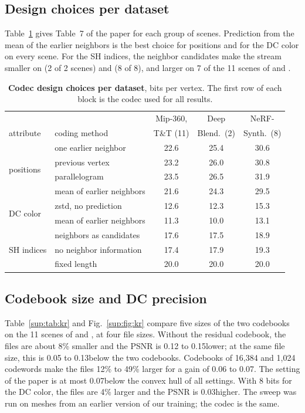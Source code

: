 \subsection{Design choices per dataset}
Table~\ref{sup:tab:choices} gives Table~7 of the paper for each group of scenes. Prediction from the mean of the earlier neighbors is the best choice for positions and for the DC color on every scene. For the SH indices, the neighbor candidates make the stream smaller on \DeepBlending (2 of 2 scenes) and \NeRFSyn (8 of 8), and larger on 7 of the 11 scenes of \MipNeRF and \TandT.

\begin{table}[h]\centering\footnotesize
\caption{\textbf{Codec design choices per dataset}, bits per vertex. The first row of each block is the codec used for all results.}
\label{sup:tab:choices}
\setlength{\tabcolsep}{3pt}
\begin{tabular}{@{}llccc@{}}
\toprule
 & & Mip-360, & Deep & NeRF- \\
attribute & coding method & T\&T (11) & Blend.\ (2) & Synth.\ (8) \\
\midrule
\multirow{4}{*}{positions} & one earlier neighbor & 22.6 & 25.4 & 30.6 \\
 & previous vertex & 23.2 & 26.0 & 30.8 \\
 & parallelogram & 23.5 & 26.5 & 31.9 \\
 & mean of earlier neighbors & 21.6 & 24.3 & 29.5 \\
\midrule
\multirow{2}{*}{DC color} & zstd, no prediction & 12.6 & 12.3 & 15.3 \\
 & mean of earlier neighbors & 11.3 & 10.0 & 13.1 \\
\midrule
\multirow{3}{*}{SH indices} & neighbors as candidates & 17.6 & 17.5 & 18.9 \\
 & no neighbor information & 17.4 & 17.9 & 19.3 \\
 & fixed length & 20.0 & 20.0 & 20.0 \\
\bottomrule
\end{tabular}
\end{table}

\subsection{Codebook size and DC precision}
Table~\ref{sup:tab:kr} and Fig.~\ref{sup:fig:kr} compare five sizes of the two codebooks on the 11 scenes of \MipNeRF and \TandT, at four file sizes. Without the residual codebook, the files are about 8\% smaller and the PSNR is 0.12 to 0.15\dB lower; at the same file size, this is 0.05 to 0.13\dB below the two codebooks. Codebooks of 16{,}384 and 1{,}024 codewords make the files 12\% to 49\% larger for a gain of 0.06 to 0.07\dB. The setting of the paper is at most 0.07\dB below the convex hull of all settings. With 8 bits for the DC color, the files are 4\% larger and the PSNR is 0.03\dB higher. The sweep was run on meshes from an earlier version of our training; the codec is the same.

